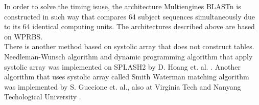 In order to solve the timing isuse, the architecture Multiengines BLASTn \cite{sotiriades2007design} is constructed in such way that compares 64 subject sequences simultaneously due to its 64 identical computing units. The architectures described above are based on WPRBS.
\\

There is another method based on systolic array that does not construct tables. Needleman-Wunsch algorithm \cite{gonnet1992exhaustive} and dynamic programming algorithm that apply systolic array was implemented on SPLASH2 by D. Hoang et. al. \cite{hoang1993searching}. Another algorithm that uses systolic array called Smith Waterman matching algorithm was implemented by S. Guccione et. al., also at Virginia Tech and Nanyang Techological University \cite{yu2003smith}. 


